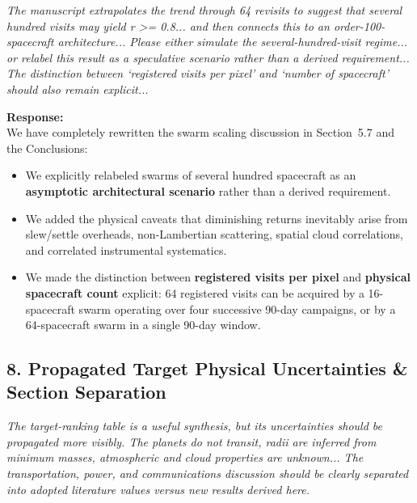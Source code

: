 \documentclass[11pt]{article}
\begin{document}
\begin{refcomment}
\textit{The manuscript extrapolates the trend through 64 revisits to suggest that several hundred visits may yield r >= 0.8... and then connects this to an order-100-spacecraft architecture... Please either simulate the several-hundred-visit regime... or relabel this result as a speculative scenario rather than a derived requirement... The distinction between `registered visits per pixel' and `number of spacecraft' should also remain explicit...}
\end{refcomment}

\textbf{Response:}\\[1mm]
We have completely rewritten the swarm scaling discussion in Section~5.7 and the Conclusions:
\begin{itemize}
\item We explicitly relabeled swarms of several hundred spacecraft as an \textbf{asymptotic architectural scenario} rather than a derived requirement.
\item We added the physical caveats that diminishing returns inevitably arise from slew/settle overheads, non-Lambertian scattering, spatial cloud correlations, and correlated instrumental systematics.
\item We made the distinction between \textbf{registered visits per pixel} and \textbf{physical spacecraft count} explicit: 64 registered visits can be acquired by a 16-spacecraft swarm operating over four successive 90-day campaigns, or by a 64-spacecraft swarm in a single 90-day window.
\end{itemize}

\subsection*{8. Propagated Target Physical Uncertainties \& Section Separation}

\begin{refcomment}
\textit{The target-ranking table is a useful synthesis, but its uncertainties should be propagated more visibly. The planets do not transit, radii are inferred from minimum masses, atmospheric and cloud properties are unknown... The transportation, power, and communications discussion should be clearly separated into adopted literature values versus new results derived here.}
\end{refcomment}
\end{document}
